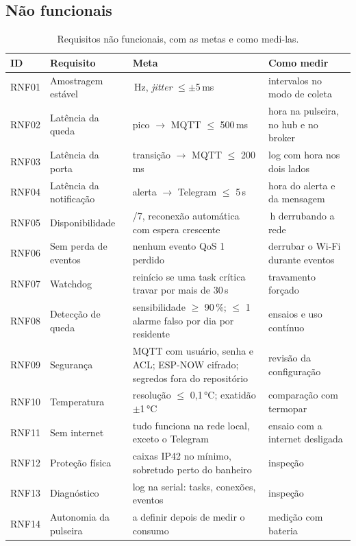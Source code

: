 \subsection{Não funcionais}

\begin{table}[H]
\centering
\caption{Requisitos não funcionais, com as metas e como medi-las.}
\label{tab:rnf}
\small
\begin{tabular}{@{}l>{\raggedright\arraybackslash}p{3.6cm}>{\raggedright\arraybackslash}p{4.4cm}>{\raggedright\arraybackslash}p{4.0cm}@{}}
\toprule
ID & Requisito & Meta & Como medir \\
\midrule
RNF01 & Amostragem estável & 200\,Hz, \textit{jitter} $\le \pm$5\,ms & intervalos no modo de coleta \\
RNF02 & Latência da queda & pico $\to$ MQTT $\le$ 500\,ms & hora na pulseira, no hub e no broker \\
RNF03 & Latência da porta & transição $\to$ MQTT $\le$ 200\,ms & log com hora nos dois lados \\
RNF04 & Latência da notificação & alerta $\to$ Telegram $\le$ 5\,s & hora do alerta e da mensagem \\
RNF05 & Disponibilidade & 24/7, reconexão automática com espera crescente & 24\,h derrubando a rede \\
RNF06 & Sem perda de eventos & nenhum evento QoS 1 perdido & derrubar o Wi-Fi durante eventos \\
RNF07 & Watchdog & reinício se uma task crítica travar por mais de 30\,s & travamento forçado \\
RNF08 & Detecção de queda & sensibilidade $\ge$ 90\,\%; $\le$ 1 alarme falso por dia por residente & ensaios e uso contínuo \\
RNF09 & Segurança & MQTT com usuário, senha e ACL; ESP-NOW cifrado; segredos fora do repositório & revisão da configuração \\
RNF10 & Temperatura & resolução $\le$ 0,1\,°C; exatidão $\pm$1\,°C & comparação com termopar \\
RNF11 & Sem internet & tudo funciona na rede local, exceto o Telegram & ensaio com a internet desligada \\
RNF12 & Proteção física & caixas IP42 no mínimo, sobretudo perto do banheiro & inspeção \\
RNF13 & Diagnóstico & log na serial: tasks, conexões, eventos & inspeção \\
RNF14 & Autonomia da pulseira & a definir depois de medir o consumo & medição com bateria \\
\bottomrule
\end{tabular}
\end{table}

